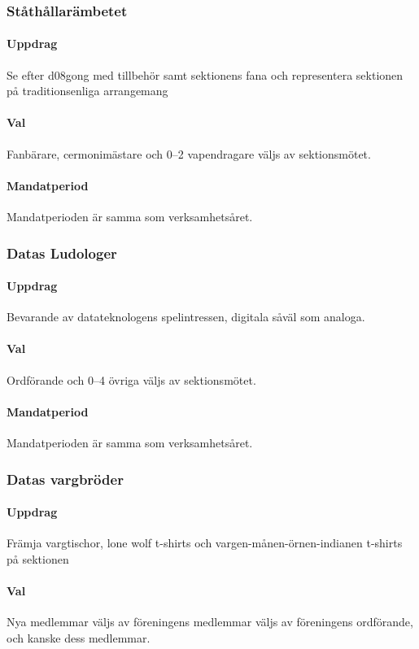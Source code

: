 \subsubsection{Ståthållarämbetet}
\paragraph{Uppdrag}
Se efter d08gong med tillbehör samt sektionens fana och representera sektionen på traditionsenliga arrangemang
\paragraph{Val}
Fanbärare, cermonimästare och 0--2 vapendragare väljs av sektionsmötet.
\paragraph{Mandatperiod}
Mandatperioden är samma som verksamhetsåret. 
\subsubsection{Datas Ludologer}
\paragraph{Uppdrag}
Bevarande av datateknologens spelintressen, digitala såväl som analoga.
\paragraph{Val}
Ordförande och 0--4 övriga väljs av sektionsmötet.
\paragraph{Mandatperiod}
Mandatperioden är samma som verksamhetsåret. 
\subsubsection{Datas vargbröder}
\paragraph{Uppdrag}
Främja vargtischor, lone wolf t-shirts och vargen-månen-örnen-indianen t-shirts på sektionen 
\paragraph{Val}
Nya medlemmar väljs av föreningens medlemmar väljs av föreningens ordförande, och kanske dess medlemmar.
